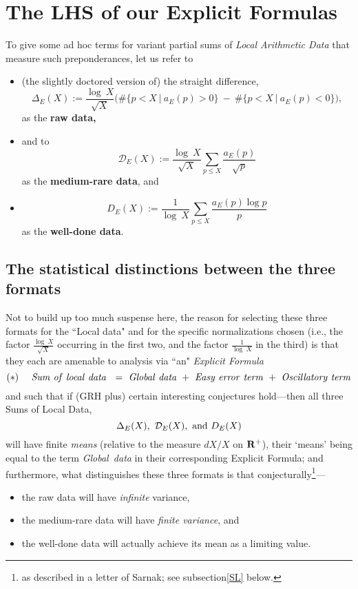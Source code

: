 \documentclass[11pt]{article}
\theoremstyle{plain}
\theoremstyle{definition}
\numberwithin{equation}{section}
\numberwithin{figure}{section}
\numberwithin{table}{section}
\begin{document}
 \section{ The LHS of our Explicit Formulas}
  To give some ad hoc terms for variant partial sums of {\it Local Arithmetic Data} that measure such preponderances,  let us refer to\begin{itemize}\item   (the slightly doctored version of) the straight difference,
 $${\Delta}_E(X):=  {\frac{\log\ X}{\sqrt X}}\big(\#\{ p < X\ | \ a_E(p) > 0\}\ - \ \#\{ p < X\ | \  a_E(p) < 0\}\big),$$  as  the {\bf raw data,} \item and to
 $${\mathcal D}_E(X):= {\frac{\log\ X}{\sqrt X}}\sum_{p \le X}{\frac{a_E(p)}{\sqrt p}}$$ as the {\bf medium-rare data}, and \item
  $${D}_E(X):= {\frac{1}{\log\ X}}\sum_{p \le X}{\frac{a_E(p)\log p}{ p}}$$  as the {\bf well-done data}.
  \end{itemize}
 \subsection{The statistical distinctions between the three formats}\label{statdist}
   Not to build up too much suspense here, the reason for selecting these three formats for the ``Local data"  and for the specific normalizations chosen (i.e., the factor $ {\frac{\log\ X}{\sqrt X}}$ occurring in the first two, and the factor  ${\frac{1}{\log\ X}}$ in the third)  is that they each are amenable to analysis via ``an" {\it Explicit Formula}
   $$(*)\  \  \  \  {\rm{\it Sum\ of\ local\ data\  }}  \ = \  {\rm{\it Global\ data}}\ + \  {\rm{\it  Easy\ error\ term}}\ + \  {\rm{\it  Oscillatory\ term}}$$
 and such that if (GRH plus)  certain interesting conjectures hold---then  all three  Sums of Local Data, $${\Delta}_E(X), \ {\mathcal D}_E(X), \ {\rm and} \ D_E(X)$$ will have finite {\it means}  (relative to the measure $dX/X$ on ${\bf R}^+$), their `means' being equal to the term  {\rm{\it Global\ data}} in their corresponding Explicit Formula;  and furthermore, what distinguishes these three formats is that conjecturally{\footnote{ as described in a letter of Sarnak; see subsection{\ref{SL}} below.}}---
   \begin{itemize}
   \item the raw data will have {\it infinite} variance,
   \item the medium-rare data will have {\it finite variance}, and
   \item the well-done data will actually achieve its mean as a limiting value.
   \end{itemize}
\end{document}
